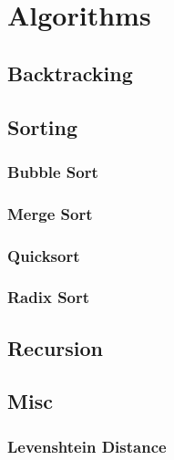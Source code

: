 \section{Algorithms}

\subsection{Backtracking}

\subsection{Sorting}

\subsubsection{Bubble Sort}
\subsubsection{Merge Sort}
\subsubsection{Quicksort}
\subsubsection{Radix Sort}

\subsection{Recursion}

\subsection{Misc}

\subsubsection{Levenshtein Distance}

